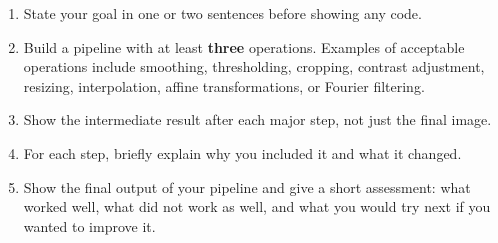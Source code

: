 \documentclass[11pt]{article}
\begin{document}
\begin{enumerate}[label=\alph*)]
  \item State your goal in one or two sentences before showing any code.

  \item Build a pipeline with at least \textbf{three} operations. Examples of acceptable operations include smoothing, thresholding, cropping, contrast adjustment, resizing, interpolation, affine transformations, or Fourier filtering.

  \item Show the intermediate result after each major step, not just the final image.

  \item For each step, briefly explain why you included it and what it changed.

  \item Show the final output of your pipeline and give a short assessment: what worked well, what did not work as well, and what you would try next if you wanted to improve it.
\end{enumerate}
\end{document}
